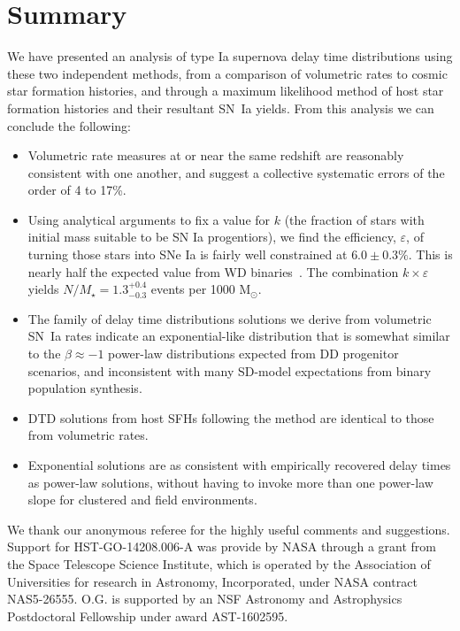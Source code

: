 \documentclass[apj, twocolumn]{aastex62}
\begin{document}
\section{Summary}
We have presented an analysis of type Ia supernova delay time distributions using these two independent methods, from a comparison of volumetric  rates to cosmic star formation histories, and through a maximum likelihood method of host star formation histories and their resultant SN~Ia yields. From this analysis we can conclude the following:
\begin{itemize}
	\item Volumetric rate measures at or near the same redshift are reasonably consistent with one another, and suggest a collective systematic errors of the order of 4 to 17\%.
	\item  Using analytical arguments to fix a value for $k$ (the fraction of stars with initial mass suitable to be SN Ia progentiors), we find the efficiency, $\varepsilon$, of turning those stars into SNe Ia is fairly well constrained at $6.0\pm0.3\%$. This is nearly half the expected value from WD binaries~\citep{Maoz:2017zl}. The combination $k\times\varepsilon$ yields $N/M_\star=1.3^{+0.4}_{-0.3}$ events per 1000 M$_{\odot}$.
	\item The family of delay time distributions solutions we derive from volumetric SN~Ia rates indicate an exponential-like distribution that is somewhat similar to the $\beta\approx-1$ power-law distributions expected from DD progenitor scenarios, and inconsistent with many SD-model expectations from binary population synthesis. 
	\item DTD solutions from host SFHs following the \cite{Maoz:2011} method are identical to those from volumetric rates. 
	\item Exponential solutions are as consistent with empirically recovered delay times as power-law solutions, without having to invoke more than one power-law slope for clustered and field environments.
\end{itemize}

\acknowledgments We thank our anonymous referee for the highly useful comments and suggestions. Support for HST-GO-14208.006-A was provide by NASA through a grant from the Space Telescope Science Institute, which is operated by the Association of Universities for research in Astronomy, Incorporated, under NASA contract NAS5-26555. O.G. is supported by an NSF Astronomy and Astrophysics Postdoctoral Fellowship under award AST-1602595.
\end{document}
